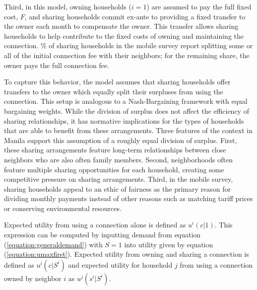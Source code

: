 \documentclass[12pt]{article}
\begin{document}
Third, in this model, owning households ($i=1$) are assumed to pay the full fixed cost, $F$, and sharing households commit ex-ante to providing a fixed transfer to the owner each month to compensate the owner.  This transfer allows sharing households to help contribute to the fixed costs of owning and maintaining the connection.  \unskip\% of sharing households in the mobile survey report splitting some or all of the initial connection fee with their neighbors; for the remaining share, the owner pays the full connection fee.  

To capture this behavior, the model assumes that sharing households offer transfers to the owner which equally split their surpluses from using the connection.  This setup is analogous to a Nash-Bargaining framework with equal bargaining weights.  While the division of surplus does not affect the efficiency of sharing relationships, it has normative implications for the types of households that are able to benefit from these arrangements.  Three features of the context in Manila support this assumption of a roughly equal division of surplus.  First, these sharing arrangements feature long-term relationships between close neighbors who are also often family members.  Second, neighborhoods often feature multiple sharing opportunities for each household, creating some competitive pressure on sharing arrangements.  Third, in the mobile survey, sharing households appeal to an ethic of fairness as the primary reason for dividing monthly payments instead of other reasons such as matching tariff prices or conserving environmental resources.

Expected utility from using a connection alone is defined as $u^{i} (c|1)$.  This expression can be computed by inputting demand from equation (\ref{equation:generaldemand}) with $S=1$ into utility given by equation (\ref{equation:umaxfirst}).  Expected utility from owning and sharing a connection is defined as $u^{i}(c | S^i ) $ and expected utility for household $j$ from using a connection owned by neighbor $i$ as $u^{j} ( s^{i} | S^i )$.  
\end{document}
